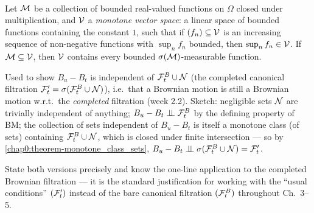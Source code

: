 \begin{theorem} \label{chap0:theorem-monotone_class_functions}  \\
Let $\mathcal{M}$ be a collection of bounded real-valued functions on $\Omega$ closed under multiplication, and $\mathcal{V}$ a \textit{monotone vector space}: a linear space of bounded functions containing the constant $1$, such that if $(f_n)\subseteq\mathcal{V}$ is an increasing sequence of non-negative functions with $\sup_n f_n$ bounded, then $\sup_n f_n\in\mathcal{V}$. If $\mathcal{M}\subseteq\mathcal{V}$, then $\mathcal{V}$ contains every bounded $\sigma(\mathcal{M})$-measurable function.
\end{theorem}

\begin{usedin} Used to show $B_u-B_t$ is independent of $\mathcal{F}_t^B\cup\mathcal{N}$ (the completed canonical filtration $\mathcal{F}_t'=\sigma(\mathcal{F}_t^B\cup\mathcal{N})$), i.e.\ that a Brownian motion is still a Brownian motion w.r.t.\ the \emph{completed} filtration (week 2.2). Sketch: negligible sets $\mathcal{N}$ are trivially independent of anything; $B_u-B_t\perp\!\!\!\perp\mathcal{F}_t^B$ by the defining property of BM; the collection of sets independent of $B_u-B_t$ is itself a monotone class (of sets) containing $\mathcal{F}_t^B\cup\mathcal{N}$, which is closed under finite intersection --- so by \cref{chap0:theorem-monotone_class_sets}, $B_u-B_t\perp\!\!\!\perp\sigma(\mathcal{F}_t^B\cup\mathcal{N})=\mathcal{F}_t'$. \end{usedin}
\begin{quizbox} State both versions precisely and know the one-line application to the completed Brownian filtration --- it is the standard justification for working with the ``usual conditions'' $(\mathcal{F}_t')$ instead of the bare canonical filtration $(\mathcal{F}_t^B)$ throughout Ch.\ 3--5. \end{quizbox}
